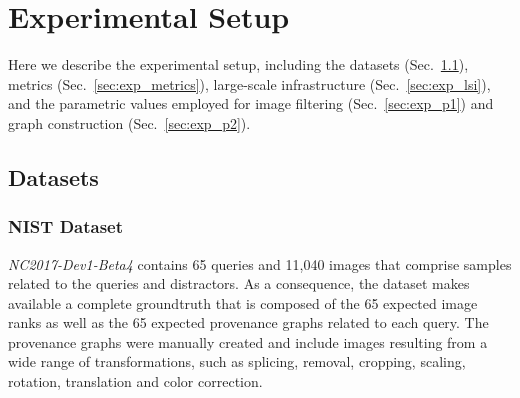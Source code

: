 \section{Experimental Setup}
\label{sec:expsetup}
Here we describe the experimental setup, including the datasets (Sec.~\ref{sec:exp_datasets}),  metrics (Sec.~\ref{sec:exp_metrics}), large-scale infrastructure (Sec.~\ref{sec:exp_lsi}), and the parametric values employed for image filtering (Sec.~\ref{sec:exp_p1}) and graph construction (Sec.~\ref{sec:exp_p2}).


\subsection{Datasets}
\label{sec:exp_datasets}

\subsubsection{NIST Dataset}

\emph{NC2017-Dev1-Beta4} contains 65 queries and 11,040 images that comprise samples related to the queries and distractors.
As a consequence, the dataset makes available a complete groundtruth that is composed of the 65 expected image ranks as well as the 65 expected provenance graphs related to each query.
The provenance graphs were manually created and include images resulting from a wide range of transformations, such as splicing, removal, cropping, scaling, rotation, translation and color correction.

